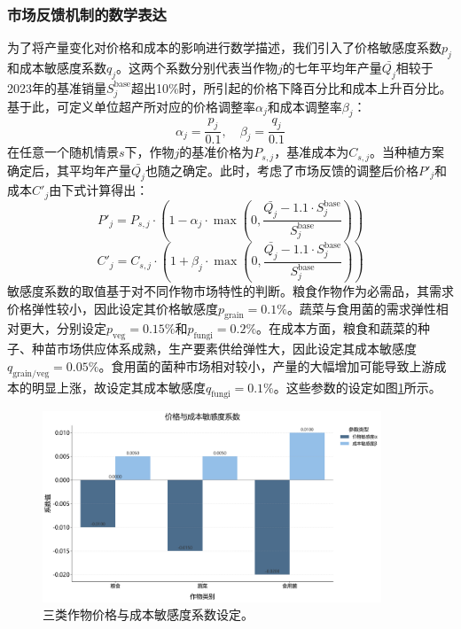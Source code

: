 \subsubsection{市场反馈机制的数学表达}
为了将产量变化对价格和成本的影响进行数学描述，我们引入了价格敏感度系数$p_j$和成本敏感度系数$q_j$。这两个系数分别代表当作物$j$的七年平均年产量$\bar{Q_j}$相较于2023年的基准销量$S_j^{\text{base}}$超出10\%时，所引起的价格下降百分比和成本上升百分比。基于此，可定义单位超产所对应的价格调整率$\alpha_j$和成本调整率$\beta_j$：
\begin{equation}
\alpha_j = \frac{p_j}{0.1}, \quad \beta_j = \frac{q_j}{0.1}
\end{equation}
在任意一个随机情景$s$下，作物$j$的基准价格为$P_{s,j}$，基准成本为$C_{s,j}$。当种植方案确定后，其平均年产量$\bar{Q_j}$也随之确定。此时，考虑了市场反馈的调整后价格$P'_{j}$和成本$C'_{j}$由下式计算得出：
\begin{equation}
P'_{j} = P_{s,j} \cdot \left(1 - \alpha_j \cdot \max\left(0, \frac{\bar{Q_j} - 1.1 \cdot S_j^{\text{base}}}{S_j^{\text{base}}}\right)\right)
\end{equation}
\begin{equation}
C'_{j} = C_{s,j} \cdot \left(1 + \beta_j \cdot \max\left(0, \frac{\bar{Q_j} - 1.1 \cdot S_j^{\text{base}}}{S_j^{\text{base}}}\right)\right)
\end{equation}
敏感度系数的取值基于对不同作物市场特性的判断。粮食作物作为必需品，其需求价格弹性较小，因此设定其价格敏感度$p_{\text{grain}}=0.1\%$。蔬菜与食用菌的需求弹性相对更大，分别设定$p_{\text{veg}}=0.15\%$和$p_{\text{fungi}}=0.2\%$。在成本方面，粮食和蔬菜的种子、种苗市场供应体系成熟，生产要素供给弹性大，因此设定其成本敏感度$q_{\text{grain/veg}}=0.05\%$。食用菌的菌种市场相对较小，产量的大幅增加可能导致上游成本的明显上涨，故设定其成本敏感度$q_{\text{fungi}}=0.1\%$。这些参数的设定如图\ref{fig:sensitivity_setup}所示。

\begin{figure}[H]
    \centering
    \includegraphics[width=0.9\textwidth]{figs/5问题三/敏感度系数设定图.png}
    \caption{三类作物价格与成本敏感度系数设定。}
    \label{fig:sensitivity_setup}
\end{figure}

